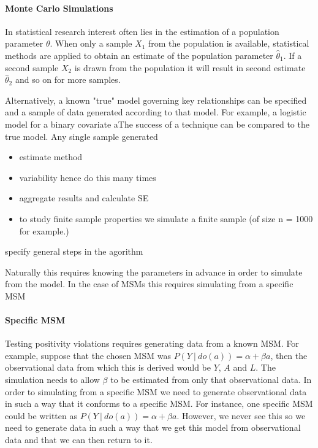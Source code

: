 \documentclass[11pt]{article}
\providecommand{\tightlist}{%
      \setlength{\itemsep}{0pt}\setlength{\parskip}{0pt}}
\begin{document}
\paragraph{Monte Carlo Simulations}\label{monte-carlo-simulations}

In statistical research interest often lies in the estimation of a
population parameter \(\theta\). When only a sample \(X_1\) from the
population is available, statistical methods are applied to obtain an
estimate of the population parameter \(\hat \theta_1\). If a second
sample \(X_2\) is drawn from the population it will result in second
estimate \(\hat \theta_2\) and so on for more samples.

Alternatively, a known "true" model governing key relationships can be
specified and a sample of data generated according to that model. For
example, a logistic model for a binary covariate aThe success of a
technique can be compared to the true model. Any single sample generated

\begin{itemize}
\tightlist
\item
  estimate method
\item
  variability hence do this many times
\item
  aggregate results and calculate SE
\item
  to study finite sample properties we simulate a finite sample (of size
  n = 1000 for example.)
\end{itemize}

specify general steps in the agorithm

Naturally this requires knowing the parameters in advance in order to
simulate from the model. In the case of MSMs this requires simulating
from a specific MSM

\paragraph{Specific MSM}\label{specific-msm}

Testing positivity violations requires generating data from a known MSM.
For example, suppose that the chosen MSM was
\(P(Y\ |\ do(a)) = \alpha + \beta a\), then the observational data from
which this is derived would be \(Y\), \(A\) and \(L\). The simulation
needs to allow \(\beta\) to be estimated from only that observational
data. In order to simulating from a specific MSM we need to generate
observational data in such a way that it conforms to a specific MSM. For
instance, one specific MSM could be written as
\(P(Y\ |\ do(a)) = \alpha + \beta a\). However, we never see this so we
need to generate data in such a way that we get this model from
observational data and that we can then return to it.
\end{document}
